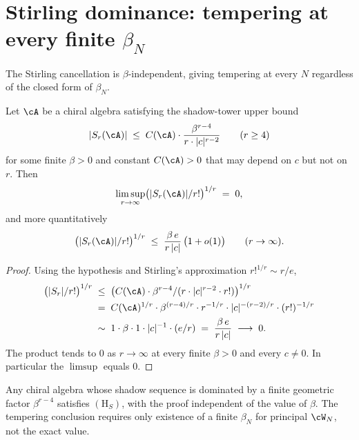 \section{Stirling dominance: tempering at every finite $\beta_N$}
\label{sec:stirling-dominance}

The Stirling cancellation is $\beta$-independent, giving tempering at
every $N$ regardless of the closed form of $\beta_N$.

\begin{proposition}
\label{prop:beta-stirling-dominance}
\ClaimStatusProvedHere
Let $\cA$ be a chiral algebra satisfying the shadow-tower upper bound
\[
 \lvert S_r(\cA) \rvert
 \;\le\;
 C(\cA) \cdot \frac{\beta^{r-4}}{r \cdot \lvert c \rvert^{r-2}}
 \qquad (r \ge 4)
\]
for some finite $\beta > 0$ and constant $C(\cA) > 0$ that may depend
on $c$ but not on $r$. Then
\[
 \limsup_{r \to \infty}
 \bigl( \lvert S_r(\cA) \rvert / r! \bigr)^{1/r}
 \;=\;
 0,
\]
and more quantitatively
\[
 \bigl(\lvert S_r(\cA)\rvert / r!\bigr)^{1/r}
 \;\le\;
 \frac{\beta\,e}{r\,|c|}\,\bigl(1 + o(1)\bigr)
 \qquad (r \to \infty).
\]
\end{proposition}

\begin{proof}
Using the hypothesis and Stirling's approximation
$r!^{1/r} \sim r/e$,
\begin{align*}
 \bigl(\lvert S_r \rvert / r!\bigr)^{1/r}
 &\;\le\; \bigl(C(\cA) \cdot \beta^{r-4}
 / (r \cdot |c|^{r-2} \cdot r!)\bigr)^{1/r} \\
 &\;=\; C(\cA)^{1/r} \cdot \beta^{(r-4)/r} \cdot r^{-1/r}
 \cdot |c|^{-(r-2)/r} \cdot (r!)^{-1/r} \\
 &\;\sim\; 1 \cdot \beta \cdot 1 \cdot |c|^{-1} \cdot (e/r)
 \;=\; \frac{\beta\,e}{r\,|c|}
 \;\longrightarrow\; 0.
\end{align*}
The product tends to $0$ as $r \to \infty$ at every finite $\beta > 0$
and every $c \ne 0$. In particular the $\limsup$ equals $0$.
\end{proof}

\begin{remark}
\label{rem:beta-independence}
Any chiral algebra whose shadow sequence is dominated by a finite
geometric factor $\beta^{r-4}$ satisfies $(\mathrm{H}_S)$, with the
proof independent of the value of $\beta$. The tempering conclusion
requires only existence of a finite $\beta_N$ for principal $\cW_N$,
not the exact value.
\end{remark}

